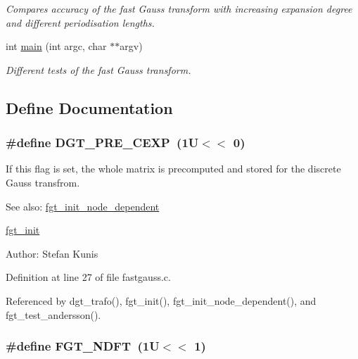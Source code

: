 \begin{CompactItemize}
\begin{CompactList}\small\item\em Compares accuracy of the fast Gauss transform with increasing expansion degree and different periodisation lengths. \item\end{CompactList}\item 
int \hyperlink{group__applications__fastgauss_ga12}{main} (int argc, char $\ast$$\ast$argv)
\begin{CompactList}\small\item\em Different tests of the fast Gauss transform. \item\end{CompactList}\end{CompactItemize}


\subsection{Define Documentation}
\hypertarget{group__applications__fastgauss_ga13}{
\subsubsection[DGT\_\-PRE\_\-CEXP]{\setlength{\rightskip}{0pt plus 5cm}\#define DGT\_\-PRE\_\-CEXP~(1U$<$$<$ 0)}}
\label{group__applications__fastgauss_ga13}


If this flag is set, the whole matrix is precomputed and stored for the discrete Gauss transfrom. 

\begin{Desc}
\item[See also:]\hyperlink{group__applications__fastgauss_ga4}{fgt\_\-init\_\-node\_\-dependent} 

\hyperlink{group__applications__fastgauss_ga3}{fgt\_\-init} \end{Desc}
\begin{Desc}
\item[Author:]Stefan Kunis \end{Desc}


Definition at line 27 of file fastgauss.c.

Referenced by dgt\_\-trafo(), fgt\_\-init(), fgt\_\-init\_\-node\_\-dependent(), and fgt\_\-test\_\-andersson().\hypertarget{group__applications__fastgauss_ga14}{
\subsubsection[FGT\_\-NDFT]{\setlength{\rightskip}{0pt plus 5cm}\#define FGT\_\-NDFT~(1U$<$$<$ 1)}}
\label{group__applications__fastgauss_ga14}



